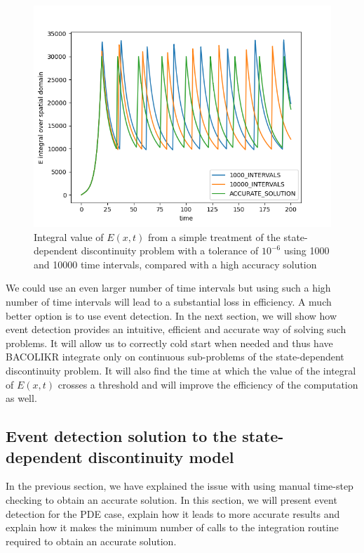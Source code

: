 \begin{figure}[H]
\centering
\includegraphics[width=0.7\linewidth]{./figures/pde_state_disc_naive_1000vs10000}
\caption{Integral value of $E(x, t)$ from a simple treatment of the state-dependent discontinuity problem with a tolerance of $10^{-6}$ using 1000 and 10000 time intervals, compared with a high accuracy solution}
\label{fig:pde_state_disc_naive_1000vs10000}
\end{figure}

We could use an even larger number of time intervals but using such a high number of time intervals will lead to a substantial loss in efficiency. A much better option is to use event detection. In the next section, we will show how event detection provides an intuitive, efficient and accurate way of solving such problems. It will allow us to correctly cold start when needed and thus have BACOLIKR integrate only on continuous sub-problems of the state-dependent discontinuity problem. It will also find the time at which the value of the integral of $E(x, t)$ crosses a threshold and will improve the efficiency of the computation as well.

\subsection{Event detection solution to the state-dependent discontinuity model}
\label{subsubsection:pde_state_event_detection}
In the previous section, we have explained the issue with using manual time-step checking to obtain an accurate solution. In this section, we will present event detection for the PDE case, explain how it leads to more accurate results and explain how it makes the minimum number of calls to the integration routine required to obtain an accurate solution.

